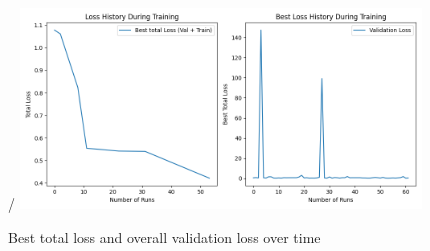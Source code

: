 \appendix
\begin{figure}
	\begin{center}
/	\includegraphics[width=0.95\textwidth]{figures/Figure_1}
	\end{center}
	\caption{Best total loss and overall validation loss over time}\label{fig:NN_learning}
\end{figure}

